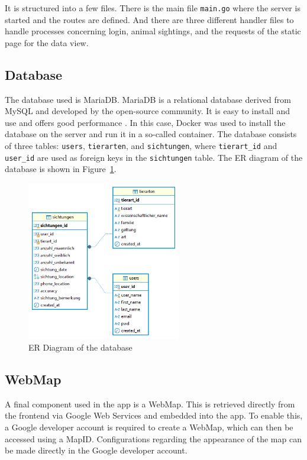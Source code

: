 \documentclass{josis}
\begin{document}
It is structured into a few files. There is the main file \texttt{main.go} where the server is started and the routes are defined.
And there are three different handler files to handle processes concerning login, animal sightings, and the requests of the static
page for the data view.

\subsection{Database}

The database used is MariaDB. MariaDB is a relational database derived from MySQL and developed by the open-source community. 
It is easy to install and use and offers good performance \cite{MariaDBFoundation}.
In this case, Docker was used to install the database on the server and run it in a so-called container. 
The database consists of three tables: \texttt{users}, \texttt{tierarten}, and \texttt{sichtungen}, 
where \texttt{tierart\_id} and \texttt{user\_id} are used as foreign keys in the \texttt{sichtungen} table. 
The ER diagram of the database is shown in Figure~\ref{fig:db_structure}.

\begin{figure}[tbh]
    \centering
    \includegraphics[width=0.6\textwidth]{images/db_structure.png}
    \caption{ER Diagram of the database}\label{fig:db_structure}
\end{figure}

\subsection{WebMap}

A final component used in the app is a WebMap. This is retrieved directly from the frontend 
via Google Web Services and embedded into the app. To enable this, 
a Google developer account is required to create a WebMap, 
which can then be accessed using a MapID. Configurations regarding the appearance of the map can be made directly in the Google developer account.
\end{document}
